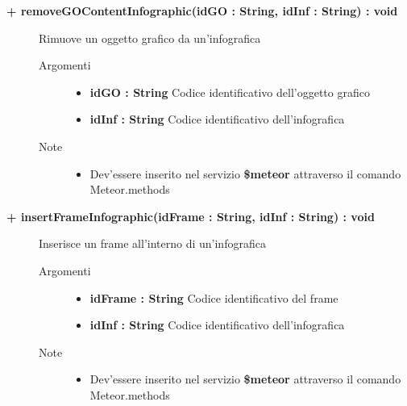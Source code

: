 \begin{description}
	\begin{description}
		\item[\textbf{\color{blue}+ removeGOContentInfographic(idGO : String, idInf : String) : void			}] \hfill
			Rimuove un oggetto grafico da un'infografica
			
		\begin{description}
			\item[Argomenti] \hfill
				\begin{itemize}
				
					\item \textbf{idGO : String			} \hfill
					Codice identificativo dell'oggetto grafico
					\item \textbf{idInf : String			} \hfill
					Codice identificativo dell'infografica
					
				\end{itemize}
			\item[Note] \hfill
			\begin{itemize}
					\item Dev'essere inserito nel servizio \textbf{\$meteor} attraverso il comando Meteor.methods
				\end{itemize}
		\end{description}
	\end{description}
	
	\begin{description}
		\item[\textbf{\color{blue}+ insertFrameInfographic(idFrame : String, idInf : String) : void			}] \hfill
			Inserisce un frame all'interno di un'infografica
			
		\begin{description}
			\item[Argomenti] \hfill
				\begin{itemize}
				
					\item \textbf{idFrame : String			} \hfill
					Codice identificativo del frame
					\item \textbf{idInf : String			} \hfill
					Codice identificativo dell'infografica
					
				\end{itemize}
			\item[Note] \hfill
			\begin{itemize}
					\item Dev'essere inserito nel servizio \textbf{\$meteor} attraverso il comando Meteor.methods
				\end{itemize}
		\end{description}
	\end{description}
	

\end{description}
